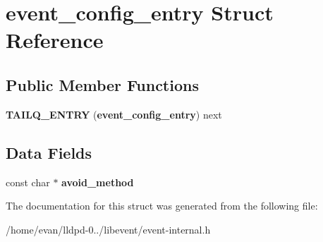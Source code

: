 \section{event\-\_\-config\-\_\-entry \-Struct \-Reference}
\label{structevent__config__entry}
\subsection*{\-Public \-Member \-Functions}
\begin{DoxyCompactItemize}
\item 
{\bfseries \-T\-A\-I\-L\-Q\-\_\-\-E\-N\-T\-R\-Y} ({\bf event\-\_\-config\-\_\-entry}) next\label{structevent__config__entry_ab892e60d4acd78ace96a9ac27033bc8a}

\end{DoxyCompactItemize}
\subsection*{\-Data \-Fields}
\begin{DoxyCompactItemize}
\item 
const char $\ast$ {\bfseries avoid\-\_\-method}\label{structevent__config__entry_a956e2a0c6d3142ad6d0e649266ef65e1}

\end{DoxyCompactItemize}


\-The documentation for this struct was generated from the following file\-:\begin{DoxyCompactItemize}
\item 
/home/evan/lldpd-\/0../libevent/event-\/internal.\-h\end{DoxyCompactItemize}
